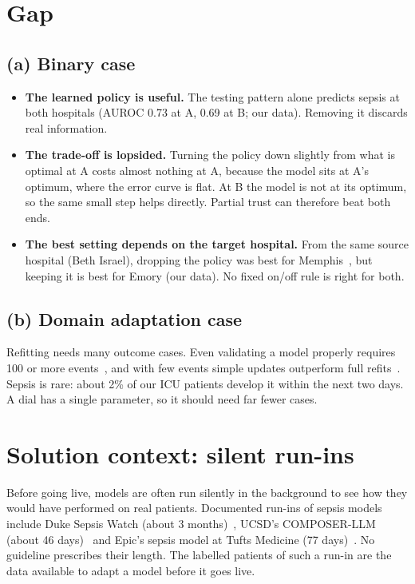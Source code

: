 \documentclass[11pt,a4paper]{article}
\begin{document}
\section{Gap}

\subsection*{(a) Binary case}
\begin{itemize}
  \item \textbf{The learned policy is useful.} The testing pattern alone predicts sepsis at both hospitals (AUROC 0.73 at A, 0.69 at B; our data). Removing it discards real information.
  \item \textbf{The trade-off is lopsided.} Turning the policy down slightly from what is optimal at A costs almost nothing at A, because the model sits at A's optimum, where the error curve is flat. At B the model is not at its optimum, so the same small step helps directly. Partial trust can therefore beat both ends.
  \item \textbf{The best setting depends on the target hospital.} From the same source hospital (Beth Israel), dropping the policy was best for Memphis~\cite{futoma2021}, but keeping it is best for Emory (our data). No fixed on/off rule is right for both.
\end{itemize}

\subsection*{(b) Domain adaptation case}
Refitting needs many outcome cases. Even validating a model properly requires 100 or more events~\cite{riley2024}, and with few events simple updates outperform full refits~\cite{steyerberg2004,vergouwe2017}. Sepsis is rare: about 2\% of our ICU patients develop it within the next two days. A dial has a single parameter, so it should need far fewer cases.

\section{Solution context: silent run-ins}

Before going live, models are often run silently in the background to see how they would have performed on real patients. Documented run-ins of sepsis models include Duke Sepsis Watch (about 3 months)~\cite{sendak2020}, UCSD's COMPOSER-LLM (about 46 days)~\cite{shashikumar2025} and Epic's sepsis model at Tufts Medicine (77 days)~\cite{tuttle2026}. No guideline prescribes their length. The labelled patients of such a run-in are the data available to adapt a model before it goes live.
\end{document}
